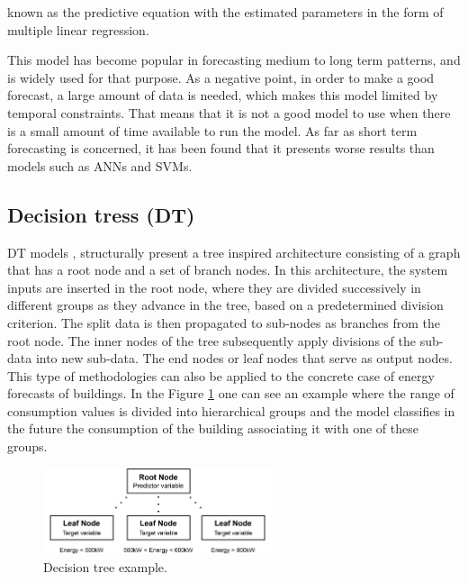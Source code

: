 known as the predictive equation with the estimated parameters in the form of multiple linear regression.
 
This model has become popular in forecasting medium to long term patterns, and is widely used for that purpose. As a negative point, in order to make a good forecast, a large amount of data is needed, which makes this model limited by temporal constraints. That means that it is not a good model to use when there is a small amount of time available to run the model. As far as short term forecasting is concerned, it has been found that it presents worse results than models such as \ac{ANN}s and \ac{SVM}s.

\subsection{Decision tress (DT)}

\ac{DT} models \cite{dt1}, structurally present a tree inspired architecture consisting of a graph that has a root node and a set of branch nodes. In this architecture, the system inputs are inserted in the root node, where they are divided successively in different groups as they advance in the tree, based on a predetermined division criterion. The split data is then propagated to sub-nodes as branches from the root node. The inner nodes of the tree subsequently apply divisions of the sub-data into new sub-data. The end nodes or leaf nodes that serve as output nodes. 
This type of methodologies can also be applied to the concrete case of energy forecasts of buildings. In the Figure \ref{dt} one can see an example where the range of consumption values is divided into hierarchical groups and the model classifies in the future the consumption of the building associating it with one of these groups.


\begin{figure}[h!]
    \centering
    \begin{center}
    \includegraphics[width=0.6\textwidth]{Images/DT.png}
    \caption{Decision tree example.}
    \label{dt}
    \end{center}
\end{figure}


